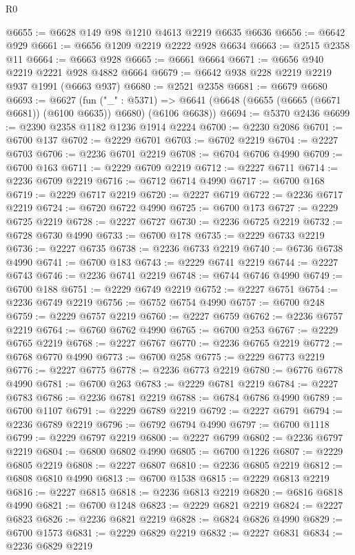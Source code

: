 \begin{lexlean}{R0}
\begin{coremodule}
@6655 := @6628 @149 @98 @1210 @4613 @2219 @6635 @6636
@6656 := @6642 @929
@6661 := @6656 @1209 @2219 @2222 @928 @6634
@6663 := @2515 @2358 @11
@6664 := @6663 @928
@6665 := @6661 @6664
@6671 := @6656 @940 @2219 @2221 @928 @4882 @6664
@6679 := @6642 @938 @228 @2219 @2219 @937 @1991 (@6663 @937)
@6680 := @2521 @2358
@6681 := @6679 @6680
@6693 := @6627
    (fun ("_" : @5371) =>
    @6641 (@6648 (@6655 (@6665 (@6671 @6681)) (@6100 @6635)) @6680) (@6106 @6638))
@6694 := @5370 @2436
@6699 := @2390 @2358 @1182 @1236 @1914 @2224
@6700 := @2230 @2086
@6701 := @6700 @137
@6702 := @2229 @6701
@6703 := @6702 @2219
@6704 := @2227 @6703
@6706 := @2236 @6701 @2219
@6708 := @6704 @6706 @4990
@6709 := @6700 @163
@6711 := @2229 @6709 @2219
@6712 := @2227 @6711
@6714 := @2236 @6709 @2219
@6716 := @6712 @6714 @4990
@6717 := @6700 @168
@6719 := @2229 @6717 @2219
@6720 := @2227 @6719
@6722 := @2236 @6717 @2219
@6724 := @6720 @6722 @4990
@6725 := @6700 @173
@6727 := @2229 @6725 @2219
@6728 := @2227 @6727
@6730 := @2236 @6725 @2219
@6732 := @6728 @6730 @4990
@6733 := @6700 @178
@6735 := @2229 @6733 @2219
@6736 := @2227 @6735
@6738 := @2236 @6733 @2219
@6740 := @6736 @6738 @4990
@6741 := @6700 @183
@6743 := @2229 @6741 @2219
@6744 := @2227 @6743
@6746 := @2236 @6741 @2219
@6748 := @6744 @6746 @4990
@6749 := @6700 @188
@6751 := @2229 @6749 @2219
@6752 := @2227 @6751
@6754 := @2236 @6749 @2219
@6756 := @6752 @6754 @4990
@6757 := @6700 @248
@6759 := @2229 @6757 @2219
@6760 := @2227 @6759
@6762 := @2236 @6757 @2219
@6764 := @6760 @6762 @4990
@6765 := @6700 @253
@6767 := @2229 @6765 @2219
@6768 := @2227 @6767
@6770 := @2236 @6765 @2219
@6772 := @6768 @6770 @4990
@6773 := @6700 @258
@6775 := @2229 @6773 @2219
@6776 := @2227 @6775
@6778 := @2236 @6773 @2219
@6780 := @6776 @6778 @4990
@6781 := @6700 @263
@6783 := @2229 @6781 @2219
@6784 := @2227 @6783
@6786 := @2236 @6781 @2219
@6788 := @6784 @6786 @4990
@6789 := @6700 @1107
@6791 := @2229 @6789 @2219
@6792 := @2227 @6791
@6794 := @2236 @6789 @2219
@6796 := @6792 @6794 @4990
@6797 := @6700 @1118
@6799 := @2229 @6797 @2219
@6800 := @2227 @6799
@6802 := @2236 @6797 @2219
@6804 := @6800 @6802 @4990
@6805 := @6700 @1226
@6807 := @2229 @6805 @2219
@6808 := @2227 @6807
@6810 := @2236 @6805 @2219
@6812 := @6808 @6810 @4990
@6813 := @6700 @1538
@6815 := @2229 @6813 @2219
@6816 := @2227 @6815
@6818 := @2236 @6813 @2219
@6820 := @6816 @6818 @4990
@6821 := @6700 @1248
@6823 := @2229 @6821 @2219
@6824 := @2227 @6823
@6826 := @2236 @6821 @2219
@6828 := @6824 @6826 @4990
@6829 := @6700 @1573
@6831 := @2229 @6829 @2219
@6832 := @2227 @6831
@6834 := @2236 @6829 @2219

\end{coremodule}
\end{lexlean}
